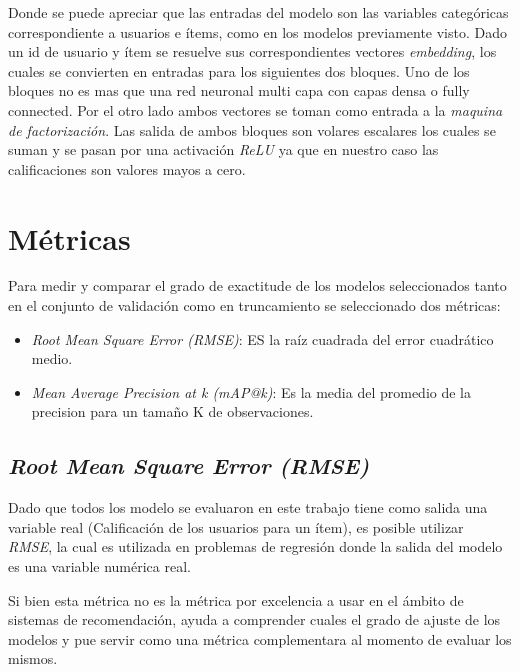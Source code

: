 \documentclass[11pt,a4paper,twoside]{thesis}
\begin{document}
Donde se puede apreciar que las entradas del modelo son las variables
categóricas correspondiente a usuarios e ítems, como en los modelos previamente
visto. Dado un id de usuario y ítem se resuelve sus correspondientes vectores
\textit{embedding}, los cuales se convierten en entradas para los siguientes
dos bloques. Uno de los bloques no es mas que una red neuronal multi capa con
capas densa o fully connected. Por el otro lado ambos vectores se toman como
entrada a la \textit{maquina de factorización}. Las salida de ambos bloques son
volares escalares los cuales se suman y se pasan por una activación
\textit{ReLU} ya que en nuestro caso las calificaciones son valores mayos a
cero.

\section{Métricas}

Para medir y comparar el grado de exactitude de los modelos seleccionados tanto
en el conjunto de validación como en truncamiento se seleccionado dos métricas:

\begin{itemize}
	\item \textit{Root Mean Square Error (RMSE)}: ES la raíz cuadrada del error cuadrático medio.
	\item \textit{Mean Average Precision at k (mAP@k)}: Es la media del promedio de la precision  para un tamaño K de observaciones.
\end{itemize}

\subsection{\textit{Root Mean Square Error (RMSE)}}

Dado que todos los modelo se evaluaron en este trabajo tiene como salida una
variable real (Calificación de los usuarios para un ítem), es posible utilizar
\textit{RMSE}, la cual es utilizada en problemas de regresión donde la salida
del modelo es una variable numérica real.

Si bien esta métrica no es la métrica por excelencia a usar en el ámbito de
sistemas de recomendación, ayuda a comprender cuales el grado de ajuste de los
modelos y pue servir como una métrica complementara al momento de evaluar los
mismos.
\end{document}
